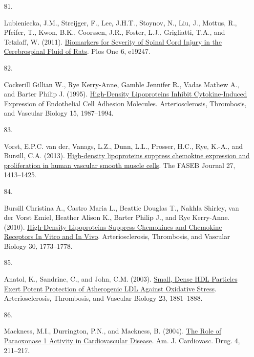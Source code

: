 \documentclass[
]{article}
\newlength{\cslhangindent}
\newlength{\csllabelwidth}
\newlength{\cslentryspacingunit} %
\newenvironment{CSLReferences}[2] %
 {%
  \setlength{\parindent}{0pt}
  \ifodd #1
  \let\oldpar\par
  \def\par{\hangindent=\cslhangindent\oldpar}
  \fi
  \setlength{\parskip}{#2\cslentryspacingunit}
 }%
 {}
\newcommand{\CSLLeftMargin}[1]{\parbox[t]{\csllabelwidth}{#1}}
\newcommand{\CSLRightInline}[1]{\parbox[t]{\linewidth - \csllabelwidth}{#1}\break}
\begin{document}
\begin{CSLReferences}{0}{0}
\leavevmode{}%
\CSLLeftMargin{81. }
\CSLRightInline{Lubieniecka, J.M., Streijger, F., Lee, J.H.T., Stoynov, N., Liu, J., Mottus, R., Pfeifer, T., Kwon, B.K., Coorssen, J.R., Foster, L.J., Grigliatti, T.A., and Tetzlaff, W. (2011). \href{https://doi.org/10.1371/journal.pone.0019247}{Biomarkers for {Severity} of {Spinal Cord Injury} in the {Cerebrospinal Fluid} of {Rats}}. Plos One 6, e19247.}

\leavevmode{}%
\CSLLeftMargin{82. }
\CSLRightInline{Cockerill Gillian W., Rye Kerry-Anne, Gamble Jennifer R., Vadas Mathew A., and Barter Philip J. (1995). \href{https://doi.org/10.1161/01.ATV.15.11.1987}{High-{Density Lipoproteins Inhibit Cytokine-Induced Expression} of {Endothelial Cell Adhesion Molecules}}. Arteriosclerosis, Thrombosis, and Vascular Biology 15, 1987--1994.}

\leavevmode{}%
\CSLLeftMargin{83. }
\CSLRightInline{Vorst, E.P.C. van der, Vanags, L.Z., Dunn, L.L., Prosser, H.C., Rye, K.-A., and Bursill, C.A. (2013). \href{https://doi.org/10.1096/fj.12-212753}{High-density lipoproteins suppress chemokine expression and proliferation in human vascular smooth muscle cells}. The FASEB Journal 27, 1413--1425.}

\leavevmode{}%
\CSLLeftMargin{84. }
\CSLRightInline{Bursill Christina A., Castro Maria L., Beattie Douglas T., Nakhla Shirley, van der Vorst Emiel, Heather Alison K., Barter Philip J., and Rye Kerry-Anne. (2010). \href{https://doi.org/10.1161/ATVBAHA.110.211342}{High-{Density Lipoproteins Suppress Chemokines} and {Chemokine Receptors In Vitro} and {In Vivo}}. Arteriosclerosis, Thrombosis, and Vascular Biology 30, 1773--1778.}

\leavevmode{}%
\CSLLeftMargin{85. }
\CSLRightInline{Anatol, K., Sandrine, C., and John, C.M. (2003). \href{https://doi.org/10.1161/01.ATV.0000091338.93223.E8}{Small, {Dense HDL Particles Exert Potent Protection} of {Atherogenic LDL Against Oxidative Stress}}. Arteriosclerosis, Thrombosis, and Vascular Biology 23, 1881--1888.}

\leavevmode{}%
\CSLLeftMargin{86. }
\CSLRightInline{Mackness, M.I., Durrington, P.N., and Mackness, B. (2004). \href{https://doi.org/10.2165/00129784-200404040-00002}{The {Role} of {Paraoxonase} 1 {Activity} in {Cardiovascular Disease}}. Am. J. Cardiovasc. Drug. 4, 211--217.}


\end{CSLReferences}
\end{document}
